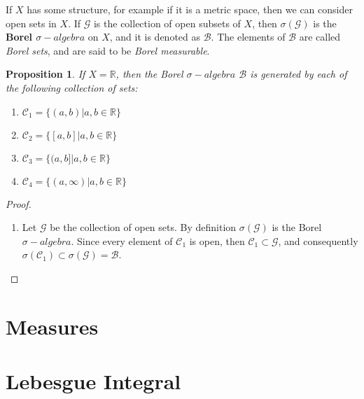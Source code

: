 \documentclass[aspectratio=169]{beamer}
\newtheorem{proposition}{Proposition}[section]
\begin{document}
\begin{frame}
    \begin{definition}
        If $X$ has some structure, for example if it is a metric space, then we can consider open sets in $X$. If $\mathcal{G}$ is the collection of open subsets of $X$, then $\sigma(\mathcal{G})$ is the \textbf{Borel $\sigma-algebra$} on $X$, and it is denoted as $\mathcal{B}$. The elements of $\mathcal{B}$ are called \textit{Borel sets}, and are said to be \textit{Borel measurable}.    
    \end{definition}
\end{frame}

\begin{frame}
    \begin{proposition}
        If $X=\mathbb{R}$, then the Borel $\sigma-algebra$ $\mathcal{B}$ is generated by each of the following collection of sets:
        \begin{enumerate}
            \item $\mathcal{C}_1=\{(a,b)|a,b\in\mathbb{R}\}$
            \item $\mathcal{C}_2=\{[a,b]|a,b\in\mathbb{R}\}$
            \item $\mathcal{C}_3=\{(a,b]|a,b\in\mathbb{R}\}$
            \item $\mathcal{C}_4=\{(a,\infty)|a,b\in\mathbb{R}\}$
        \end{enumerate}
    \end{proposition}
\end{frame}

\begin{frame}
    \begin{proof}
        \begin{enumerate}
            \item Let $\mathcal{G}$ be the collection of open sets. By definition $\sigma(\mathcal{G})$ is the Borel $\sigma-algebra$. Since every element of $\mathcal{C}_1$ is open, then $\mathcal{C}_1\subset\mathcal{G}$, and consequently $\sigma(\mathcal{C}_1)\subset \sigma(\mathcal{G})=\mathcal{B}$.
        \end{enumerate}
        
    \end{proof}
    
\end{frame}

\section{Measures}

\section{Lebesgue Integral}
\end{document}
